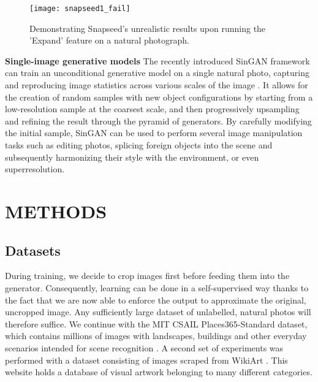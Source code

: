 \documentclass[twocolumn,showpacs,nofootinbib,aps,superscriptaddress,eqsecnum,prd,notitlepage,showkeys,10pt]{revtex4-1}
\begin{document}
\begin{figure}[tp]
\centering
  \begin{adjustbox}{center}
  \texttt{[image: snapseed1\_fail]}
  \end{adjustbox}
  \caption{Demonstrating Snapseed's \cite{snapseed} unrealistic results upon running the 'Expand' feature on a natural photograph.}
  \label{fig:snapseed_fail}
\end{figure}

\textbf{Single-image generative models} \hspace{0.3cm}
The recently introduced SinGAN framework can train an unconditional generative model on a single natural photo, capturing and reproducing image statistics across various scales of the image \cite{Shaham2019}. It allows for the creation of random samples with new object configurations by starting from a low-resolution sample at the coarsest scale, and then progressively upsampling and refining the result through the pyramid of generators. By carefully modifying the initial sample, SinGAN can be used to perform several image manipulation tasks such as editing photos, splicing foreign objects into the scene and subsequently harmonizing their style with the environment, or even superresolution.

\section{METHODS}

\subsection{Datasets}

\hspace{\parindent} During training, we decide to crop images first before feeding them into the generator. Consequently, learning can be done in a self-supervised way thanks to the fact that we are now able to enforce the output to approximate the original, uncropped image. Any sufficiently large dataset of unlabelled, natural photos will therefore suffice. We continue with the MIT CSAIL Places365-Standard dataset, which contains millions of images with landscapes, buildings and other everyday scenarios intended for scene recognition \cite{Zhou2018}. A second set of experiments was performed with a dataset consisting of images scraped from WikiArt \cite{wikiart}. This website holds a database of visual artwork belonging to many different categories.
\end{document}
